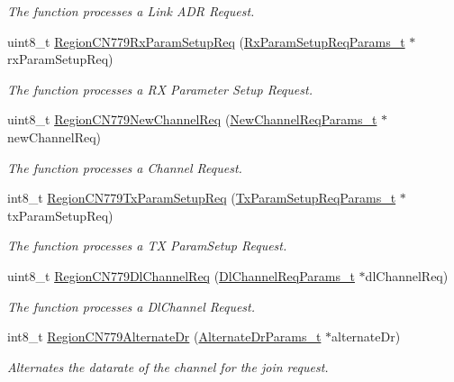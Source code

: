 \begin{DoxyCompactItemize}
\begin{DoxyCompactList}\small\item\em The function processes a Link A\+DR Request. \end{DoxyCompactList}\item 
uint8\+\_\+t \hyperlink{group__REGIONCN779_gad14dfe4070bdf46142d09d35d617b25c}{Region\+C\+N779\+Rx\+Param\+Setup\+Req} (\hyperlink{group__REGION_ga7165f282c670c728c36d534df2285157}{Rx\+Param\+Setup\+Req\+Params\+\_\+t} $\ast$rx\+Param\+Setup\+Req)
\begin{DoxyCompactList}\small\item\em The function processes a RX Parameter Setup Request. \end{DoxyCompactList}\item 
uint8\+\_\+t \hyperlink{group__REGIONCN779_gab4c6ffa72f1da0e2ef40431ab7fd72fa}{Region\+C\+N779\+New\+Channel\+Req} (\hyperlink{group__REGION_gae2abcdb6dbb843c9faf5fd3009eca9d6}{New\+Channel\+Req\+Params\+\_\+t} $\ast$new\+Channel\+Req)
\begin{DoxyCompactList}\small\item\em The function processes a Channel Request. \end{DoxyCompactList}\item 
int8\+\_\+t \hyperlink{group__REGIONCN779_ga6dc963da2e0b143e7313780fcd946855}{Region\+C\+N779\+Tx\+Param\+Setup\+Req} (\hyperlink{group__REGION_ga26836ef2996e70410e42ef471073f855}{Tx\+Param\+Setup\+Req\+Params\+\_\+t} $\ast$tx\+Param\+Setup\+Req)
\begin{DoxyCompactList}\small\item\em The function processes a TX Param\+Setup Request. \end{DoxyCompactList}\item 
uint8\+\_\+t \hyperlink{group__REGIONCN779_gaa34ccc032a50e5bef17fc59ca5eb89bc}{Region\+C\+N779\+Dl\+Channel\+Req} (\hyperlink{group__REGION_gae0d608ff1f8ea0a430e4f9a4c38ec7f3}{Dl\+Channel\+Req\+Params\+\_\+t} $\ast$dl\+Channel\+Req)
\begin{DoxyCompactList}\small\item\em The function processes a Dl\+Channel Request. \end{DoxyCompactList}\item 
int8\+\_\+t \hyperlink{group__REGIONCN779_ga2ea0c39d57f08b798e30c7207f1cf165}{Region\+C\+N779\+Alternate\+Dr} (\hyperlink{group__REGION_ga001ea4338d1c83f4c785b49d7ad2d696}{Alternate\+Dr\+Params\+\_\+t} $\ast$alternate\+Dr)
\begin{DoxyCompactList}\small\item\em Alternates the datarate of the channel for the join request. \end{DoxyCompactList}\item 

\end{DoxyCompactItemize}
